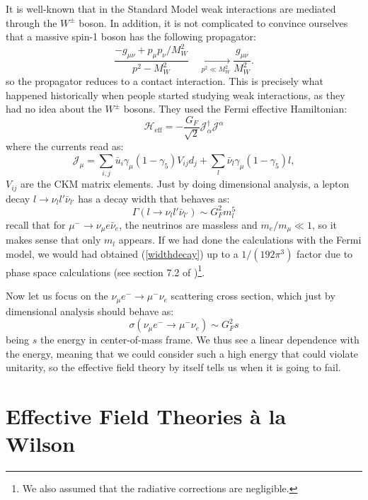 \documentclass[11pt]{article}
\begin{document}
It is well-known that in the Standard Model weak interactions are mediated through the $W^\pm$ boson. In addition, it is not complicated to convince ourselves that a massive spin-1 boson has the following propagator:
\begin{equation}
    \frac{-g_{\mu\nu} + p_\mu p_\nu / M_W^2}{p^2 - M_W^2} \quad \xrightarrow[p^2 \ll M_W^2] \quad \frac{g_{\mu\nu}}{M_W^2}.
\end{equation}
so the propagator reduces to a contact interaction. This is precisely what happened historically when people started studying weak interactions, as they had no idea about the $W^\pm$ bosons. They used the Fermi effective Hamiltonian:
\begin{equation}
    \mathcal{H}_{\text{eff}}=-\dfrac{G_F}{\sqrt{2}}\mathcal{J}^\dagger_\alpha \mathcal{J}^{\alpha}
\end{equation}
where the currents read as:
\begin{equation}
    \mathcal{J}_{\mu} = \sum_{i,j} \bar{u}_i \gamma_{\mu} (1 - \gamma_5) V_{ij} d_j + \sum_{l} \bar{\nu}_l \gamma_{\mu} (1 - \gamma_5) l ,
\end{equation}
$V_{ij}$ are the CKM matrix elements. Just by doing dimensional analysis, a lepton decay $l\to \nu_l l'\bar{\nu}_{l'}$ has a decay width that behaves as:
\begin{equation}\label{widthdecay}
    \Gamma(l\to \nu_l l'\bar{\nu}_{l'})\sim G_F^2m_l^5
\end{equation}
recall that for $\mu^-\to \nu_\mu e\bar{\nu}_{e}$, the neutrinos are massless and $m_e/m_\mu \ll 1$, so it makes sense that only $m_l$ appears. If we had done the calculations with the Fermi model, we would had obtained (\ref{widthdecay}) up to a $1/(192\pi^3)$ factor due to phase space calculations (see section 7.2 of \cite{Langacker:2017uah})\footnote{We also assumed that the radiative corrections are negligible.}.

Now let us focus on the $\nu_\mu e^-\to \mu^- \nu_e$ scattering cross section, which just by dimensional analysis should behave as:
\begin{equation}
    \sigma(\nu_\mu e^-\to \mu^- \nu_e)\sim G_F^2s
\end{equation}
being $s$ the energy in center-of-mass frame. We thus see a linear dependence with the energy, meaning that we could consider such a high energy that could violate unitarity, so the effective field theory by itself tells us when it is going to fail.
\section{Effective Field Theories à la Wilson}
\end{document}
